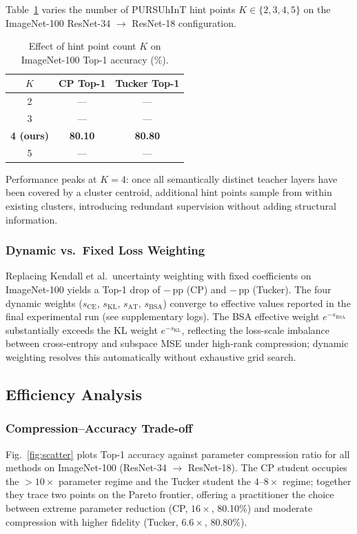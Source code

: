 \documentclass[conference]{IEEEtran}
\begin{document}
Table~\ref{tab:ablation_hints} varies the number of PURSUhInT hint points
$K \in \{2, 3, 4, 5\}$ on the ImageNet-100 ResNet-34 $\to$ ResNet-18
configuration.

\begin{table}[t]
  \centering
  \caption{Effect of hint point count $K$ on ImageNet-100 Top-1 accuracy (\%).}
  \label{tab:ablation_hints}
  \begin{tabular}{ccc}
    \toprule
    $K$ & \textbf{CP Top-1} & \textbf{Tucker Top-1} \\
    \midrule
    2              & — & — \\
    3              & — & — \\
    \textbf{4 (ours)} & \textbf{80.10} & \textbf{80.80} \\
    5              & — & — \\
    \bottomrule
  \end{tabular}
\end{table}

Performance peaks at $K\!=\!4$: once all semantically distinct teacher layers
have been covered by a cluster centroid, additional hint points sample from
within existing clusters, introducing redundant supervision without adding
structural information.

\subsubsection{Dynamic vs.\ Fixed Loss Weighting}

Replacing Kendall et al.\ uncertainty weighting with fixed coefficients on
ImageNet-100 yields a Top-1 drop of $-$\,pp (CP) and $-$\,pp (Tucker).
The four dynamic weights ($s_\mathrm{CE}$, $s_\mathrm{KL}$, $s_\mathrm{AT}$,
$s_\mathrm{BSA}$) converge to effective values reported in the final
experimental run (see supplementary logs). The BSA effective weight
$e^{-s_\mathrm{BSA}}$ substantially exceeds the KL weight $e^{-s_\mathrm{KL}}$,
reflecting the loss-scale imbalance between cross-entropy and subspace MSE
under high-rank compression; dynamic weighting resolves this automatically
without exhaustive grid search.

\subsection{Efficiency Analysis}
\label{sec:efficiency}

\subsubsection{Compression--Accuracy Trade-off}
Fig.~\ref{fig:scatter} plots Top-1 accuracy against parameter compression
ratio for all methods on ImageNet-100 (ResNet-34 $\to$ ResNet-18). The CP
student occupies the $>\!10\times$ parameter regime and the Tucker student
the $4$--$8\times$ regime; together they trace two points on the Pareto
frontier, offering a practitioner the choice between extreme parameter
reduction (CP, $16\times$, 80.10\%) and moderate compression with higher
fidelity (Tucker, $6.6\times$, 80.80\%).
\end{document}
